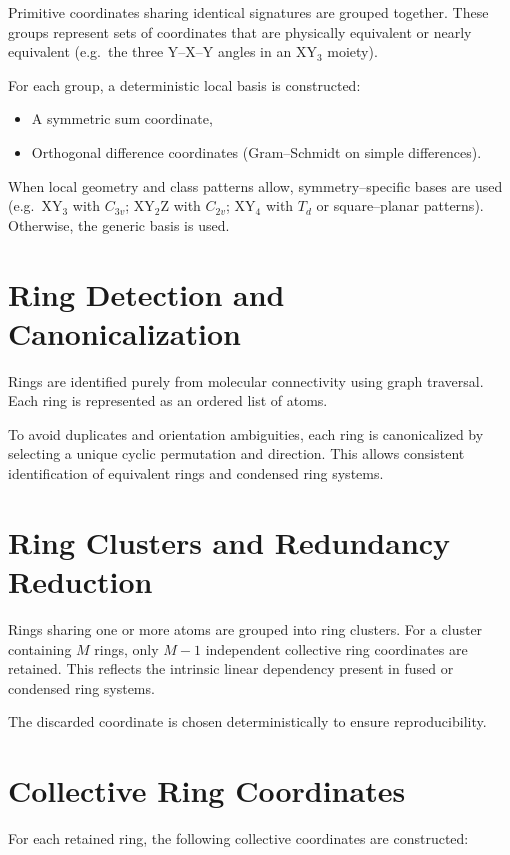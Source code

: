 \documentclass[11pt,a4paper]{article}
\begin{document}
Primitive coordinates sharing identical signatures are grouped together.
These groups represent sets of coordinates that are physically equivalent or
nearly equivalent (e.g.\ the three Y--X--Y angles in an XY$_3$ moiety).

For each group, a deterministic local basis is constructed:
\begin{itemize}
  \item A symmetric sum coordinate,
  \item Orthogonal difference coordinates (Gram--Schmidt on simple differences).
\end{itemize}

When local geometry and class patterns allow, symmetry--specific bases are used
(e.g.\ XY$_3$ with $C_{3v}$; XY$_2$Z with $C_{2v}$; XY$_4$ with $T_d$ or
square--planar patterns). Otherwise, the generic basis is used.

\section{Ring Detection and Canonicalization}

Rings are identified purely from molecular connectivity using graph traversal.
Each ring is represented as an ordered list of atoms.

To avoid duplicates and orientation ambiguities, each ring is canonicalized
by selecting a unique cyclic permutation and direction.
This allows consistent identification of equivalent rings and condensed
ring systems.

\section{Ring Clusters and Redundancy Reduction}

Rings sharing one or more atoms are grouped into ring clusters.
For a cluster containing $M$ rings, only $M-1$ independent collective ring
coordinates are retained.
This reflects the intrinsic linear dependency present in fused or condensed
ring systems.

The discarded coordinate is chosen deterministically to ensure reproducibility.

\section{Collective Ring Coordinates}

For each retained ring, the following collective coordinates are constructed:
\end{document}
